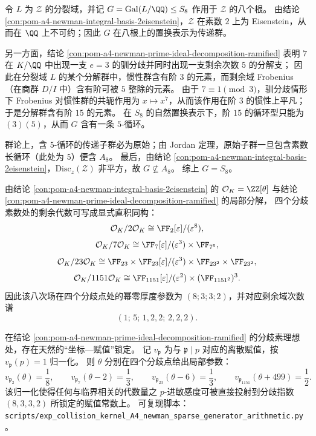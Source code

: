 \begin{conclusion}[“两素数证书”强制 \texorpdfstring{$S_8$}{S8}：由 \(p=2\) 的 Eisenstein、\(p=7\) 的 \((3)(5)\) 与非平方判别式]\label{con:pom-a4-newman-two-prime-s8}
令 \(L\) 为 \(\mathcal Z\) 的分裂域，并记 \(G=\mathrm{Gal}(L/\QQ)\le S_8\) 作用于 \(\mathcal Z\) 的八个根。
由结论 \ref{con:pom-a4-newman-integral-basis-2eisenstein}，\(\mathcal Z\) 在素数 \(2\) 上为 Eisenstein，从而在 \(\QQ\) 上不可约；因此 \(G\) 在八根上的置换表示为传递群。
\par
另一方面，结论 \ref{con:pom-a4-newman-prime-ideal-decomposition-ramified} 表明 \(7\) 在 \(K/\QQ\) 中出现一支 \(e=3\) 的驯分歧并同时出现一支剩余次数 \(5\) 的分解支；
因此在分裂域 \(L\) 的某个分解群中，惯性群含有阶 \(3\) 的元素，而剩余域 Frobenius（在商群 \(D/I\) 中）含有阶可被 \(5\) 整除的元素。
由于 \(7\equiv 1\pmod 3\)，驯分歧情形下 Frobenius 对惯性群的共轭作用为 \(x\mapsto x^{7}\)，从而该作用在阶 \(3\) 的惯性上平凡；
于是分解群含有阶 \(15\) 的元素。
在 \(S_8\) 的自然置换表示下，阶 \(15\) 的循环型只能为 \((3)(5)\)，从而 \(G\) 含有一条 \(5\)-循环。
\par
群论上，含 \(5\)-循环的传递子群必为原始；由 Jordan 定理，原始子群一旦包含素数长循环（此处为 \(5\)）便含 \(A_8\)。
最后，由结论 \ref{con:pom-a4-newman-integral-basis-2eisenstein}，\(\mathrm{Disc}_z(\mathcal Z)\) 非平方，故 \(G\nsubseteq A_8\)。
综上 \(G=S_8\)。
\end{conclusion}

\begin{conclusion}\label{con:pom-a4-newman-residue-algebra-decomposition}
由结论 \ref{con:pom-a4-newman-integral-basis-2eisenstein} 的 \(\mathcal O_K=\ZZ[\theta]\) 与结论 \ref{con:pom-a4-newman-prime-ideal-decomposition-ramified} 的局部分解，
四个分歧素数处的剩余代数可写成显式直积同构：
\[
\mathcal O_K/2\mathcal O_K \cong \FF_2[\varepsilon]/(\varepsilon^8),
\]
\[
\mathcal O_K/7\mathcal O_K \cong \FF_7[\varepsilon]/(\varepsilon^3)\times \FF_{7^5},
\]
\[
\mathcal O_K/23\mathcal O_K \cong \FF_{23}\times \FF_{23}[\varepsilon]/(\varepsilon^3)\times \FF_{23^2}\times \FF_{23^2},
\]
\[
\mathcal O_K/1151\mathcal O_K \cong \FF_{1151}[\varepsilon]/(\varepsilon^2)\times (\FF_{1151^2})^{3}.
\]
因此该八次场在四个分歧点处的幂零厚度参数为 \((8;3;3;2)\)，并对应剩余域次数谱
\[
(1;\,5;\,1,2,2;\,2,2,2).
\]
\end{conclusion}

\begin{conclusion}\label{con:pom-a4-newman-normalized-local-parameters}
在结论 \ref{con:pom-a4-newman-prime-ideal-decomposition-ramified} 的分歧素理想处，存在天然的“坐标—赋值”锁定。
记 \(v_{\mathfrak p}\) 为与 \(\mathfrak p\mid p\) 对应的离散赋值，按 \(v_{\mathfrak p}(p)=1\) 归一化。
则 \(\theta\) 分别在四个分歧点给出局部参数：
\[
v_{\mathfrak p_2}(\theta)=\frac{1}{8},\qquad
v_{\mathfrak p_7}(\theta-2)=\frac{1}{3},\qquad
v_{\mathfrak p_{23}}(\theta-6)=\frac{1}{3},\qquad
v_{\mathfrak p_{1151}}(\theta+499)=\frac{1}{2}.
\]
该归一化使得任何与临界相关的代数量之 \(p\)-进敏感度可被直接投射到分歧指数 \((8,3,3,2)\) 所锁定的赋值常数上。
可复现脚本：\texttt{scripts/exp\_collision\_kernel\_A4\_newman\_sparse\_generator\_arithmetic.py}。
\end{conclusion}
